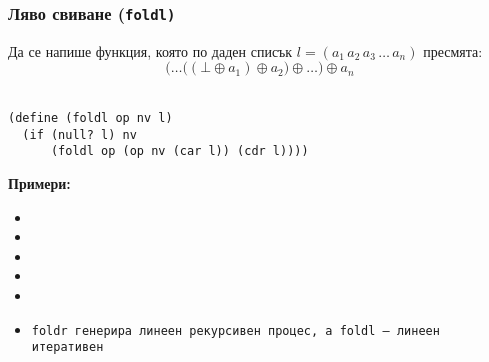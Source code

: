 \documentclass{beamer}
\begin{document}
\begin{frame}[fragile]
  \frametitle{Ляво свиване (\tt{foldl})}

  Да се напише функция, която по даден списък $l = (a_1\,a_2\,a_3\,\ldots\,a_n)$ пресмята:
  \begin{equation*}
    \Big(\ldots\big((\bot \oplus a_1) \oplus a_2\big) \oplus \ldots\Big) \oplus a_n
  \end{equation*}\\[-0.5em]
  \pause
\begin{lstlisting}
(define (foldl op nv l)
  (if (null? l) nv
      (foldl op (op nv (car l)) (cdr l))))
\end{lstlisting}
  \pause
  \textbf{Примери:}
  \small
  \begin{itemize}[<+->]
  \item {}
  \item {}
  \item {}
  \item {}
  \item {}
  \item \tt{foldr} генерира линеен рекурсивен процес, а \tt{foldl} --- линеен итеративен
  \end{itemize}
\end{frame}
\end{document}
